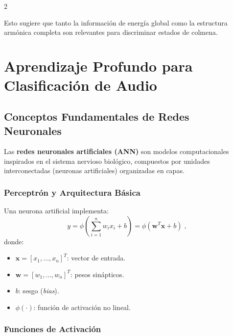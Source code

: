 \documentclass[12pt]{report}
\newenvironment{tightmulticols}{%
  \begin{multicols}{2}
  \setlength{\parskip}{1.2pt}
  \linespread{1}\selectfont
}{%
  \end{multicols}
}
\begin{document}
\begin{tightmulticols}

\noindent Esto sugiere que tanto la información de energía global como la estructura armónica completa son relevantes para discriminar estados de colmena.


\section{Aprendizaje Profundo para Clasificación de Audio}

\subsection{Conceptos Fundamentales de Redes Neuronales}

\noindent Las \textbf{redes neuronales artificiales (ANN)} son modelos computacionales inspirados en el sistema nervioso biológico, compuestos por unidades interconectadas (neuronas artificiales) organizadas en capas.

\subsubsection{Perceptrón y Arquitectura Básica}

\noindent Una neurona artificial implementa:
\begin{equation*}
    y = \phi\left(\sum_{i=1}^{n} w_i x_i + b\right) = \phi(\mathbf{w}^T\mathbf{x} + b) \; ,
\end{equation*}
\noindent donde:
\begin{itemize}
    \item $\mathbf{x} = [x_1, \ldots, x_n]^T$: vector de entrada.
    \item $\mathbf{w} = [w_1, \ldots, w_n]^T$: pesos sinápticos.
    \item $b$: sesgo (\textit{bias}).
    \item $\phi(\cdot)$: función de activación no lineal.
\end{itemize}

\subsubsection{Funciones de Activación}


\end{tightmulticols}
\end{document}
